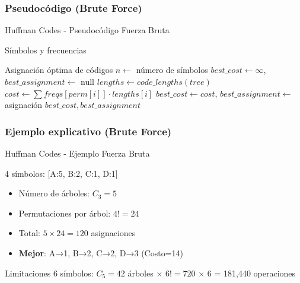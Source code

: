 \documentclass[aspectratio=169]{beamer}
\renewcommand{\algorithmicrequire}{\textbf{Entrada:}}
\renewcommand{\algorithmicensure}{\textbf{Salida:}}
\newcommand{\REQUIRE}{\item[\algorithmicrequire]}
\newcommand{\ENSURE}{\item[\algorithmicensure]}
\begin{document}
\subsubsection{Pseudocódigo (Brute Force)}
\begin{frame}[fragile]{Huffman Codes - Pseudocódigo Fuerza Bruta}
\begin{algorithmic}[1]
\REQUIRE Símbolos y frecuencias
\ENSURE Asignación óptima de códigos
\State $n \leftarrow$ número de símbolos
\State $best\_cost \leftarrow \infty$, $best\_assignment \leftarrow$ null
    \State $lengths \leftarrow code\_lengths(tree)$
        \State $cost \leftarrow \sum freqs[perm[i]] \cdot lengths[i]$
            \State $best\_cost \leftarrow cost$, $best\_assignment \leftarrow$ asignación
        \EndIf
    \EndFor
\EndFor
\Return $best\_cost, best\_assignment$
\end{algorithmic}
\end{frame}

\subsubsection{Ejemplo explicativo (Brute Force)}
\begin{frame}{Huffman Codes - Ejemplo Fuerza Bruta}
\begin{exampleblock}{4 símbolos: [A:5, B:2, C:1, D:1]}
\begin{itemize}
\item Número de árboles: $C_3 = 5$
\item Permutaciones por árbol: $4! = 24$
\item Total: $5 \times 24 = 120$ asignaciones
\item \textbf{Mejor}: A→1, B→2, C→2, D→3 (Costo=14)
\end{itemize}
\end{exampleblock}

\begin{alertblock}{Limitaciones}
6 símbolos: $C_5 = 42$ árboles $\times$ $6! = 720$ $\times$ 6 = 181,440 operaciones
\end{alertblock}
\end{frame}
\end{document}
